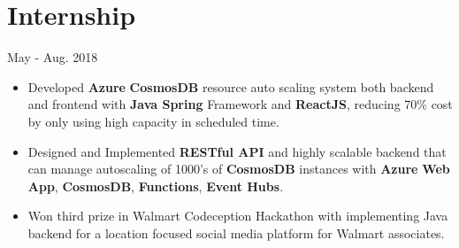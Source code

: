 \documentclass{resume}
\begin{document}
\section{Internship}
 {\hfill   May - Aug. 2018}
\begin{itemize}
\item{Developed \textbf{Azure} \textbf{CosmosDB} resource auto scaling system both backend and frontend with \textbf{Java Spring} Framework and \textbf{ReactJS}, reducing 70\% cost by only using high capacity in scheduled time.}
\item{Designed and Implemented \textbf{RESTful API} and highly scalable backend that can manage autoscaling of 1000's of \textbf{CosmosDB} instances with \textbf{Azure} \textbf{Web App}, \textbf{CosmosDB}, \textbf{Functions}, \textbf{Event Hubs}.}
\item{Won third prize in Walmart Codeception Hackathon with implementing Java backend for a location focused social media platform for Walmart associates.}
\end{itemize}
\end{document}
